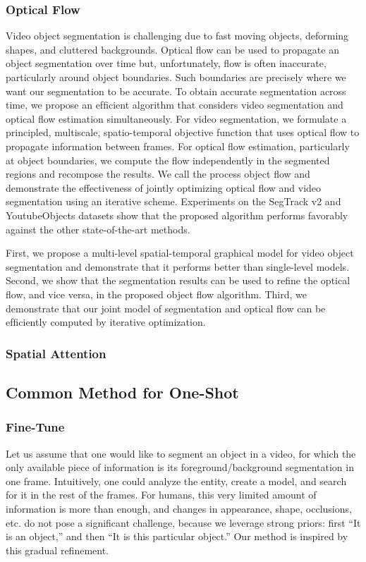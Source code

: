 \subsubsection{Optical Flow}
Video object segmentation is challenging due to fast moving objects, deforming shapes, and cluttered backgrounds. Optical ﬂow can be used to propagate an object segmentation over time but, unfortunately, ﬂow is often inaccurate, particularly around object boundaries. Such boundaries are precisely where we want our segmentation to be accurate. To obtain accurate segmentation across time, we propose an efﬁcient algorithm that considers video segmentation and optical ﬂow estimation simultaneously. For video segmentation, we formulate a principled, multiscale, spatio-temporal objective function that uses optical ﬂow to propagate information between frames. For optical ﬂow estimation, particularly at object boundaries, we compute the ﬂow independently in the segmented regions and recompose the results. We call the process object ﬂow and demonstrate the effectiveness of jointly optimizing optical ﬂow and video segmentation using an iterative scheme. Experiments on the SegTrack v2 and YoutubeObjects datasets show that the proposed algorithm performs favorably against the other state-of-the-art methods.

First, we propose a multi-level spatial-temporal graphical model for video object segmentation and demonstrate that it performs better than single-level models. Second, we show that the segmentation results can be used to reﬁne the optical ﬂow, and vice versa, in the proposed object ﬂow algorithm. Third, we demonstrate that our joint model of segmentation and optical ﬂow can be efﬁciently computed by iterative optimization.

\subsubsection{Spatial Attention}


\subsection{Common Method for One-Shot}

\subsubsection{Fine-Tune}
Let us assume that one would like to segment an object in a video, for which the only available piece of information is its foreground/background segmentation in one frame. Intuitively, one could analyze the entity, create a model, and search for it in the rest of the frames. For humans, this very limited amount of information is more than enough, and changes in appearance, shape, occlusions, etc. do not pose a signiﬁcant challenge, because we leverage strong priors: ﬁrst “It is an object,” and then “It is this particular object.” Our method is inspired by this gradual reﬁnement.

